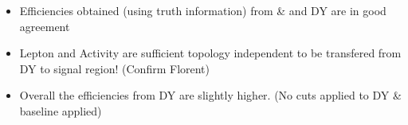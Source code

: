 \documentclass{beamer}
\begin{document}
\begin{frame}
\begin{columns}
\begin{column}{0.33\textwidth}
   \end{column}
  \end{columns}
\begin{itemize}
 \item Efficiencies obtained (using truth information) from \ttbar \& \wpj and DY are in good agreement
 \item Lepton \pt and Activity are sufficient topology independent to be transfered from DY to signal region! (Confirm Florent)
 \item Overall the efficiencies from DY are slightly higher. (No cuts applied to DY \ttbar \& \wpj baseline applied)
\end{itemize}
\end{frame}
\end{document}
